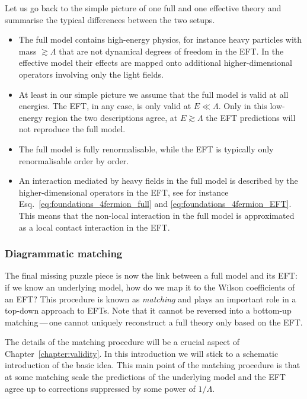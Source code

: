 Let us go back to the simple picture of one full and one effective
theory and summarise the typical differences between the two setups.
%
\begin{itemize}
\item The full model contains high-energy physics, for instance heavy
  particles with mass $\gtrsim \Lambda$ that are not dynamical degrees
  of freedom in the EFT. In the effective model their effects are
  mapped onto additional higher-dimensional operators involving only
  the light fields.
%
\item At least in our simple picture we assume that the full model is
  valid at all energies. The EFT, in any case, is only valid at
  $E \ll \Lambda$. Only in this low-energy region the two descriptions
  agree, at $E \gtrsim \Lambda$ the EFT predictions will not reproduce
  the full model.
%
\item The full model is fully renormalisable, while the EFT is
  typically only renormalisable order by order.
%
\item An interaction mediated by heavy fields in the full model is
  described by the higher-dimensional operators in the EFT, see for
  instance Esq.~\eqref{eq:foundations_4fermion_full} and
  \eqref{eq:foundations_4fermion_EFT}. This means that the non-local
  interaction in the full model is approximated as a local contact
  interaction in the EFT.
\end{itemize}

  
\subsubsection*{Diagrammatic matching}

The final missing puzzle piece is now the link between a full model
and its EFT: if we know an underlying model, how do we map it to the
Wilson coefficients of an EFT? This procedure is known as
\emph{matching} and plays an important role in a top-down approach to
EFTs. Note that it cannot be reversed into a bottom-up
matching\,---\,one cannot uniquely reconstruct a full theory only
based on the EFT.

The details of the matching procedure will be a crucial aspect of
Chapter~\ref{chapter:validity}. In this introduction we will stick
to a schematic introduction of the basic idea. This main point of the
matching procedure is that at some matching scale the predictions of the
underlying model and the EFT agree up to corrections suppressed by
some power of $1/\Lambda$.


